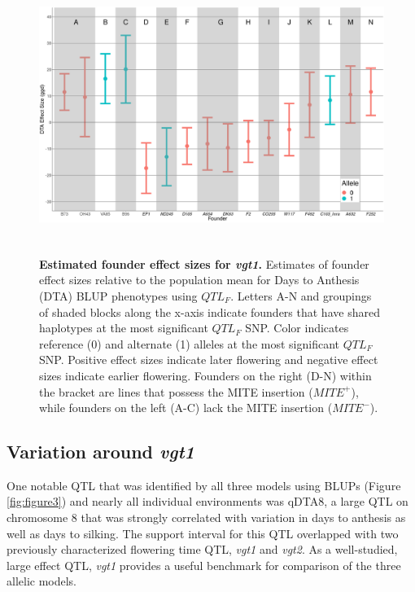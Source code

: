 \documentclass[9pt,twocolumn,twoside]{gsag3jnl}
\begin{document}
\begin{figure}[ht!]
\centering
\includegraphics[width=17cm,height=9cm]{figures/vgt1_Figure4.png}
\caption{\textbf{Estimated founder effect sizes for \emph{vgt1}.} Estimates of founder effect sizes relative to the population mean for Days to Anthesis (DTA) BLUP phenotypes using $QTL_F$. Letters A-N and groupings of shaded blocks along the x-axis indicate founders that have shared haplotypes at the most significant $QTL_F$ SNP. Color indicates reference (0) and alternate (1) alleles at the most significant $QTL_F$ SNP. Positive effect sizes indicate later flowering and negative effect sizes indicate earlier flowering. Founders on the right (D-N) within the bracket are lines that possess the MITE insertion ($MITE^+$), while founders on the left (A-C) lack the MITE insertion ($MITE^-$).}
\label{fig:foundervgt1figure}
\end{figure}

\subsection{Variation around \emph{vgt1}}
One notable QTL that was identified by all three models using BLUPs (Figure \ref{fig:figure3}) and nearly all individual environments was qDTA8, a large QTL on chromosome 8 that was strongly correlated with variation in days to anthesis as well as days to silking.
The support interval for this QTL overlapped with two previously characterized flowering time QTL, \emph{vgt1} and \emph{vgt2}.
As a well-studied, large effect QTL, \emph{vgt1} provides a useful benchmark for comparison of the three allelic models.
\end{document}
